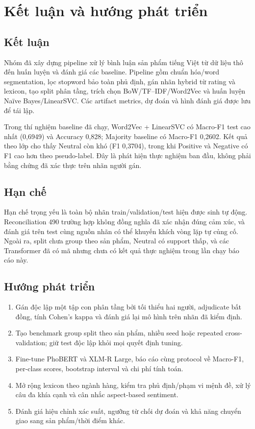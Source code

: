 \chapter{Kết luận và hướng phát triển}

\section{Kết luận}
Nhóm đã xây dựng pipeline xử lý bình luận sản phẩm tiếng Việt từ dữ liệu thô đến huấn luyện và đánh giá các baseline. Pipeline gồm chuẩn hóa/word segmentation, lọc stopword bảo toàn phủ định, gán nhãn hybrid từ rating và lexicon, tạo split phân tầng, trích chọn BoW/TF--IDF/Word2Vec và huấn luyện Naïve Bayes/LinearSVC. Các artifact metrics, dự đoán và hình đánh giá được lưu để tái lập.

Trong thí nghiệm baseline đã chạy, Word2Vec + LinearSVC có Macro-F1 test cao nhất (0,6949) và Accuracy 0,828; Majority baseline có Macro-F1 0,2602. Kết quả theo lớp cho thấy Neutral còn khó (F1 0,3704), trong khi Positive và Negative có F1 cao hơn theo pseudo-label. Đây là phát hiện thực nghiệm ban đầu, không phải bằng chứng đã xác thực trên nhãn người gán.

\section{Hạn chế}
Hạn chế trọng yếu là toàn bộ nhãn train/validation/test hiện được sinh tự động. Reconciliation 490 trường hợp không đồng nghĩa đã xác nhận đúng cảm xúc, và đánh giá trên test cùng nguồn nhãn có thể khuyến khích vòng lặp tự củng cố. Ngoài ra, split chưa group theo sản phẩm, Neutral có support thấp, và các Transformer đã có mã nhưng chưa có kết quả thực nghiệm trong lần chạy báo cáo này.

\section{Hướng phát triển}
\begin{enumerate}
  \item Gán độc lập một tập con phân tầng bởi tối thiểu hai người, adjudicate bất đồng, tính Cohen's kappa và đánh giá lại mô hình trên nhãn đã kiểm định.
  \item Tạo benchmark group split theo sản phẩm, nhiều seed hoặc repeated cross-validation; giữ test độc lập khỏi mọi quyết định tuning.
  \item Fine-tune PhoBERT và XLM-R Large, báo cáo cùng protocol về Macro-F1, per-class scores, bootstrap interval và chi phí tính toán.
  \item Mở rộng lexicon theo ngành hàng, kiểm tra phủ định/phạm vi mệnh đề, xử lý câu đa khía cạnh và cân nhắc aspect-based sentiment.
  \item Đánh giá hiệu chỉnh xác suất, ngưỡng từ chối dự đoán và khả năng chuyển giao sang sản phẩm/thời điểm khác.
\end{enumerate}

